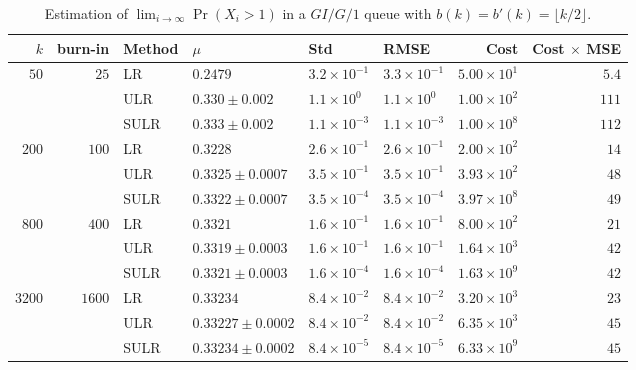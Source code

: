 \documentclass[a4paper,11pt]{article}
\begin{document}
\begin{table}
\caption{Estimation of \(\lim_{i\rightarrow\infty}\Pr(X_{i}>1)\) in a \(GI/G/1\) queue with \(b(k)=b'(k)=\lfloor k/2\rfloor\).}
\begin{small}
\begin{tabular}{rrllllrr}\hline
$k$ &  burn-in & Method & $\mu$ & Std & RMSE & Cost& Cost $\times$ MSE\\ \hline $50$&$25 $&LR & $0.2479$ & $3.2\times10^{-1}$ & $3.3\times10^{-1}$ & $5.00\times10^1$ & $5.4$\\
& &ULR & $0.330 \pm 0.002$ & $1.1\times10^0$ & $1.1\times10^0$ & $1.00\times10^2$ & $111$\\
& &SULR & $0.333 \pm 0.002$ & $1.1\times10^{-3}$ & $1.1\times10^{-3}$ & $1.00\times10^8$ & $112$\\
$200$&$100 $&LR & $0.3228$ & $2.6\times10^{-1}$ & $2.6\times10^{-1}$ & $2.00\times10^2$ & $14$\\
& &ULR & $0.3325 \pm 0.0007$ & $3.5\times10^{-1}$ & $3.5\times10^{-1}$ & $3.93\times10^2$ & $48$\\
& &SULR & $0.3322 \pm 0.0007$ & $3.5\times10^{-4}$ & $3.5\times10^{-4}$ & $3.97\times10^8$ & $49$\\
$800$&$400 $&LR & $0.3321$ & $1.6\times10^{-1}$ & $1.6\times10^{-1}$ & $8.00\times10^2$ & $21$\\
& &ULR & $0.3319 \pm 0.0003$ & $1.6\times10^{-1}$ & $1.6\times10^{-1}$ & $1.64\times10^3$ & $42$\\
& &SULR & $0.3321 \pm 0.0003$ & $1.6\times10^{-4}$ & $1.6\times10^{-4}$ & $1.63\times10^9$ & $42$\\
$3200$&$1600 $&LR & $0.33234$ & $8.4\times10^{-2}$ & $8.4\times10^{-2}$ & $3.20\times10^3$ & $23$\\
& &ULR & $0.33227 \pm 0.0002$ & $8.4\times10^{-2}$ & $8.4\times10^{-2}$ & $6.35\times10^3$ & $45$\\
& &SULR & $0.33234 \pm 0.0002$ & $8.4\times10^{-5}$ & $8.4\times10^{-5}$ & $6.33\times10^9$ & $45$\\
\hline\end{tabular}
 \end{small}
\label{tab:GG0.5}
\end{table}
\end{document}
